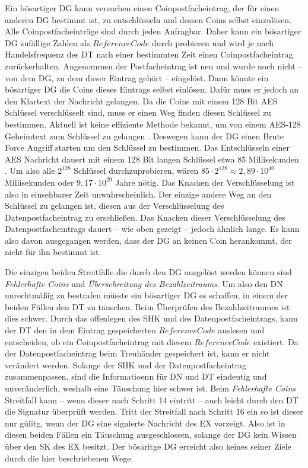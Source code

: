 \documentclass[
	fontsize=11pt,
	headings=small,
	parskip=half,           %
	bibliography=totoc,
	numbers=noenddot,       %
	open=any,               %
]{scrreprt}
\begin{document}
Ein bösartiger DG kann versuchen einen Coinpostfacheintrag, der für einen anderen DG bestimmt ist, zu entschlüsseln und dessen Coins selbst einzulösen. Alle Coinpostfacheinträge sind durch jeden Anfragbar. Daher kann ein bösartiger DG zufällige Zahlen als $ReferenceCode$ durch probieren und wird je nach Handelsfrequenz des DT nach einer bestimmten Zeit einen Coinpostfacheintrag zurückerhalten. Angenommen der Postfacheintrag ist neu und wurde noch nicht -- von dem DG, zu dem dieser Eintrag gehört -- eingelöst. Dann könnte ein bösartiger DG die Coins dieses Eintrags selbst einlösen. Dafür muss er jedoch an den Klartext der Nachricht gelangen. Da die Coins mit einem 128 Bit AES Schlüssel verschlüsselt sind, muss er einen Weg finden diesen Schlüssel zu bestimmen. Aktuell ist keine effiziente Methode bekannt, um von einem AES-128 Geheimtext zum Schlüssel zu gelangen \cite{aes-Biryukov2010Key}. Deswegen kann der DG einen Brute Force Angriff starten um den Schlüssel zu bestimmen. Das Entschlüsseln einer AES Nachricht dauert mit einem 128 Bit langen Schlüssel etwa 85 Millisekunden \cite{aes-Kumar2016Implementation}. Um also alle $2^{128}$ Schlüssel durchzuprobieren, wären $85\cdot 2^{128} \approx 2,89\cdot10^{40}$ Millisekunden oder $9,17\cdot10^{29}$ Jahre nötig. Das Knacken der Verschlüsselung ist also in einsehbarer Zeit unwahrscheinlich. Der einzige andere Weg an den Schlüssel zu gelangen ist, diesen aus der Verschlüsselung des Datenpostfacheintrag zu erschließen. Das Knacken dieser Verschlüsselung des Datenpostfacheintrags dauert -- wie oben gezeigt -- jedoch ähnlich lange. Es kann also davon ausgegangen werden, dass der DG an keinen Coin herankommt, der nicht für ihn bestimmt ist. 

Die einzigen beiden Streitfälle die durch den DG ausgelöst werden können sind \textit{Fehlerhafte Coins} und \textit{Überschreitung des Bezahlzeitraums}. Um also den DN unrechtmäßig zu bestrafen müsste ein bösartiger DG es schaffen, in einem der beiden Fällen den DT zu täuschen. Beim Überprüfen des Bezahlzeitraumes ist dies schwer. Durch das offenlegen des SHK und des Datenpostfacheintrags, kann der DT den in dem Eintrag gespeicherten $ReferenceCode$ auslesen und entscheiden, ob ein Coinpostfacheintrag mit diesem $ReferenceCode$ existiert. Da der Datenpostfacheintrag beim Treuhänder gespeichert ist, kann er nicht verändert werden. Solange der SHK und der Datenpostfacheintrag zusammenpassen, sind die Informatioenn für DN und DT eindeutig und unveränderlich, weshalb eine Täuschung hier schwer ist. Beim \textit{Fehlerhafte Coins} Streitfall kann -- wenn dieser nach Schritt 14 eintritt -- auch leicht durch den DT die Signatur überprüft werden. Tritt der Streitfall nach Schritt 16 ein so ist dieser nur gülitg, wenn der DG eine signierte Nachricht des EX vorzeigt. Also ist in diesen beiden Fällen ein Täuschung ausgeschlossen, solange der DG kein Wissen über den SK des EX besitzt. Der bösaritge DG erreicht also keines seiner Ziele durch die hier beschriebenen Wege.
\end{document}
